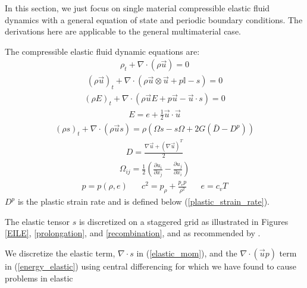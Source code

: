 \documentclass[]{article}
\newcommand{\EyeTen}{\mathbb{I}}
\begin{document}
In this section, we just focus on single material compressible 
elastic fluid dynamics
with a general equation of state and periodic boundary conditions.  
The derivations here are applicable to the
general multimaterial case.  
\par\noindent
The compressible elastic fluid dynamic 
equations\cite{tran2004particle,maire2013nominally,camacho1997adaptive} are:
\begin{eqnarray}
\rho_{t}+\nabla\cdot(\rho\vec{u})=0 \label{pde1elastic}
\end{eqnarray}
\begin{eqnarray}
(\rho \vec{u})_{t}+\nabla\cdot(\rho\vec{u}\otimes\vec{u}+p\EyeTen-s)=0
\label{elastic_mom}
\end{eqnarray}
\begin{eqnarray}
(\rho E)_{t}+\nabla\cdot(\rho\vec{u}E+p\vec{u}-\vec{u}\cdot s)=0
\label{energy_elastic}
\end{eqnarray}
\begin{eqnarray}
E=e+\frac{1}{2}\vec{u}\cdot\vec{u}
\end{eqnarray}
\begin{eqnarray}
(\rho s)_{t}+\nabla\cdot(\rho\vec{u}s)= 
\rho(\Omega s-s\Omega+2G(\bar{D}-D^{p}))
\end{eqnarray}
\begin{eqnarray}
D=\frac{\nabla\vec{u}+(\nabla\vec{u})^{T}}{2}
\end{eqnarray}
\begin{eqnarray}
\Omega_{ij}=\frac{1}{2}(
\frac{\partial u_{i}}{\partial x_{j}}-
\frac{\partial u_{j}}{\partial x_{i}})
\end{eqnarray}
\begin{eqnarray}
p=p(\rho,e) \hspace{20pt} c^{2}=p_{\rho}+\frac{p_{e}p}{\rho^{2}} 
\hspace{20pt} e=c_{v}T \label{pde2elastic}
\end{eqnarray}
$D^{p}$ is the plastic strain rate and is defined 
below (\ref{plastic_strain_rate}).
\par\noindent
The elastic tensor $s$ is discretized on a staggered grid as 
illustrated in Figures 
\ref{EILE},
\ref{prolongation},
and \ref{recombination},
and as recommended by
\cite{sugiyama2011full,shin2020interaction,PARK2026132}.
\par\noindent
We discretize the elastic term, 
$\nabla\cdot s$ in (\ref{elastic_mom}), and
the $\nabla\cdot(\vec{u}p)$ term in (\ref{energy_elastic}) using 
central differencing for which we have found to cause problems in elastic
\end{document}
